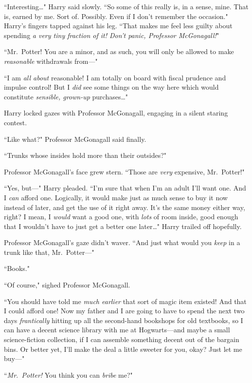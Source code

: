 ``Interesting{\ldots}" Harry said slowly. ``So some of this really is, in a sense, mine. That is, earned by me. Sort of. Possibly. Even if I don't remember the occasion." Harry's fingers tapped against his leg. ``That makes me feel less guilty about spending \emph{a very tiny fraction of it! Don't panic, Professor McGonagall!}"

``Mr.~Potter! You are a minor, and as such, you will only be allowed to make \emph{reasonable} withdrawals from—"

``I am \emph{all about} reasonable! I am totally on board with fiscal prudence and impulse control! But I \emph{did} see some things on the way here which would constitute \emph{sensible, grown-up} purchases{\ldots}"

Harry locked gazes with Professor McGonagall, engaging in a silent staring contest.

``Like what?" Professor McGonagall said finally.

``Trunks whose insides hold more than their outsides?"

Professor McGonagall's face grew stern. ``Those are \emph{very} expensive, Mr.~Potter!"

``Yes, but—" Harry pleaded. ``I'm sure that when I'm an adult I'll want one. And I \emph{can} afford one. Logically, it would make just as much sense to buy it now instead of later, and get the use of it right away. It's the same money either way, right? I mean, I \emph{would} want a good one, with \emph{lots} of room inside, good enough that I wouldn't have to just get a better one later{\ldots}" Harry trailed off hopefully.

Professor McGonagall's gaze didn't waver. ``And just what would you \emph{keep} in a trunk like that, Mr.~Potter—"

``Books."

``Of course," sighed Professor McGonagall.

``You should have told me \emph{much earlier} that sort of magic item existed! And that I could afford one! Now my father and I are going to have to spend the next two days \emph{frantically} hitting up all the second-hand bookshops for old textbooks, so I can have a decent science library with me at Hogwarts—and maybe a small science-fiction collection, if I can assemble something decent out of the bargain bins. Or better yet, I'll make the deal a little sweeter for you, okay? Just let me buy—"

``\emph{Mr.~Potter!} You think you can \emph{bribe} me?"

